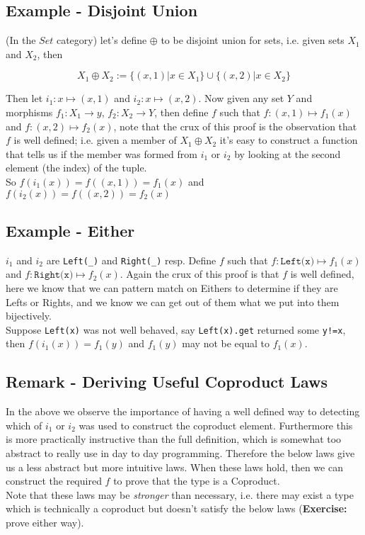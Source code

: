 \documentclass[9pt]{article} %
\begin{document}
\subsection{Example - Disjoint Union}

(In the $Set$ category) let's define $\oplus$ to be disjoint union for sets, i.e. given sets $X_1$ and $X_2$, then 

$$X_1 \oplus X_2 := \{ (x, 1) | x \in X_1 \} \cup \{ (x, 2) | x \in X_2 \} $$

\noindent Then let $i_1: x \mapsto (x, 1)$ and $i_2: x \mapsto (x, 2)$. 
Now given any set $Y$ and morphisms $f_1: X_1 \rightarrow y$, $f_2: X_2 \rightarrow Y$, then define $f$ such that $f: (x, 1) \mapsto f_1(x)$ and $f: (x, 2) \mapsto f_2(x)$, note that the crux of this proof is the observation that $f$ is well defined; i.e. given a member of $X_1 \oplus X_2$ it's easy to construct a function that tells us if the member was formed from $i_1$ or $i_2$ by looking at the second element (the index) of the tuple.\newline
\\
\noindent So $f(i_1(x)) = f((x, 1)) = f_1(x)$ and $f(i_2(x)) = f((x, 2)) = f_2(x)$ \blacksquare

\subsection{Example - Either}

$i_1$ and $i_2$ are \texttt{Left(\_)} and \texttt{Right(\_)} resp.  Define $f$ such that $f: \texttt{Left(x)} \mapsto f_1(x)$ and $f: \texttt{Right(x)} \mapsto f_2(x)$.  Again the crux of this proof is that $f$ is well defined, here we know that we can pattern match on Eithers to determine if they are Lefts or Rights, and we know we can get out of them what we put into them bijectively. \newline
\\
\noindent Suppose \texttt{Left(x)} was not well behaved, say \texttt{Left(x).get} returned some \texttt{y!=x}, then $f(i_1(x)) = f_1(y)$ and $f_1(y)$ may not be equal to $f_1(x)$.

\subsection{Remark - Deriving Useful Coproduct Laws}

In the above we observe the importance of having a well defined way to detecting which of $i_1$ or $i_2$ was used to construct the coproduct element. Furthermore this is more practically instructive than the full definition, which is somewhat too abstract to really use in day to day programming.  Therefore the below laws give us a less abstract but more intuitive laws.  When these laws hold, then we can construct the required $f$ to prove that the type is a Coproduct.\newline
\\
Note that these laws may be \textit{stronger} than necessary, i.e. there may exist a type which is technically a coproduct but doesn't satisfy the below laws (\textbf{Exercise:} prove either way).
\end{document}
